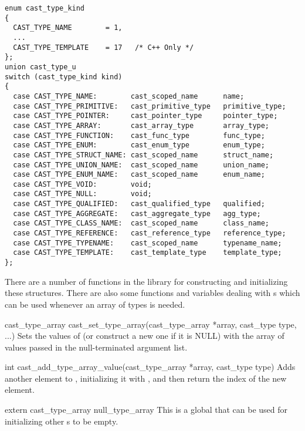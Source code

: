 \begin{verbatim}
enum cast_type_kind
{
  CAST_TYPE_NAME        = 1,
  ...
  CAST_TYPE_TEMPLATE    = 17   /* C++ Only */
};
union cast_type_u
switch (cast_type_kind kind)
{
  case CAST_TYPE_NAME:        cast_scoped_name      name;
  case CAST_TYPE_PRIMITIVE:   cast_primitive_type   primitive_type;
  case CAST_TYPE_POINTER:     cast_pointer_type     pointer_type;
  case CAST_TYPE_ARRAY:       cast_array_type       array_type;
  case CAST_TYPE_FUNCTION:    cast_func_type        func_type;
  case CAST_TYPE_ENUM:        cast_enum_type        enum_type;
  case CAST_TYPE_STRUCT_NAME: cast_scoped_name      struct_name;
  case CAST_TYPE_UNION_NAME:  cast_scoped_name      union_name;
  case CAST_TYPE_ENUM_NAME:   cast_scoped_name      enum_name;
  case CAST_TYPE_VOID:        void;
  case CAST_TYPE_NULL:        void;
  case CAST_TYPE_QUALIFIED:   cast_qualified_type   qualified;
  case CAST_TYPE_AGGREGATE:   cast_aggregate_type   agg_type;
  case CAST_TYPE_CLASS_NAME:  cast_scoped_name      class_name;
  case CAST_TYPE_REFERENCE:   cast_reference_type   reference_type;
  case CAST_TYPE_TYPENAME:    cast_scoped_name      typename_name;
  case CAST_TYPE_TEMPLATE:    cast_template_type    template_type;
};
\end{verbatim}

There are a number of functions in the \CAST{} library for constructing and
initializing these structures.  There are also some functions and variables
dealing with s which can be used whenever an array of
\CAST{} types is needed.

\begin{cprototypelist}
  \item[cast_type_array cast_set_type_array(cast_type_array *array,
  cast_type type, ...)] Sets the values of  (or construct a
  new one if it is NULL) with the array of values passed in the null-terminated
  argument list.

  \item[int cast_add_type_array_value(cast_type_array *array,
  cast_type type)] Adds another element to , initializing it
  with , and then return the index of the new element.

  \item[extern cast_type_array null_type_array] This is a global
  that can be used for initializing other s to be empty.
\end{cprototypelist}

